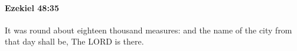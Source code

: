 		\paragraph{Ezekiel 48:35} %
			\label{EZEKIEL-48-35}

			It was round about eighteen thousand measures: and the name of the city from that day shall be, The LORD is there.


